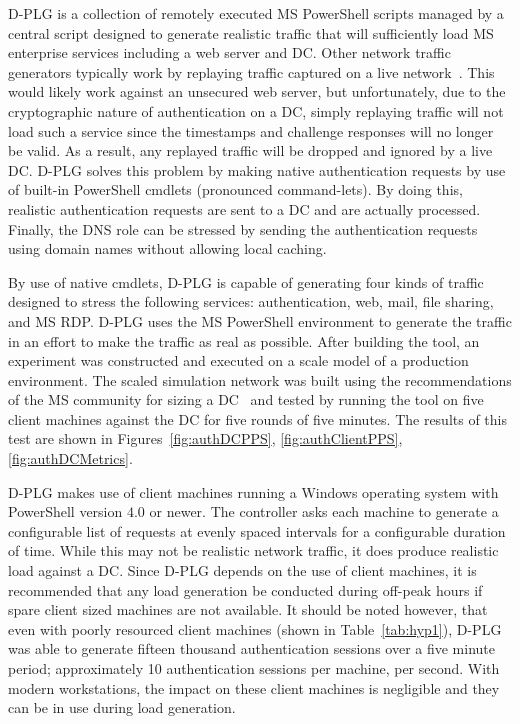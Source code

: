 \ac{D-PLG} is a collection of remotely executed \ac{MS} PowerShell scripts
managed by a central script designed to generate realistic traffic that will
sufficiently load \ac{MS} enterprise services including a web server and
\ac{DC}.  Other network traffic generators typically work by replaying traffic
captured on a live network~\cite{jordan2016}.  This would likely work against
an unsecured web server, but unfortunately, due to the cryptographic nature of
authentication on a \ac{DC}, simply replaying traffic will not load such a
service since the timestamps and challenge responses will no longer be valid.
As a result, any replayed traffic will be dropped and ignored by a live
\ac{DC}.  \ac{D-PLG} solves this problem by making native authentication
requests by use of built-in PowerShell cmdlets (pronounced command-lets).  By
doing this, realistic authentication requests are sent to a \ac{DC} and are
actually processed.  Finally, the \ac{DNS} role can be stressed by sending the
authentication requests using domain names without allowing local caching.

By use of native cmdlets, \ac{D-PLG} is capable of generating four kinds of
traffic designed to stress the following services: authentication, web, mail,
file sharing, and \ac{MS} \ac{RDP}.  \ac{D-PLG} uses the \ac{MS} PowerShell
environment to generate the traffic in an effort to make the traffic as real as
possible.  After building the tool, an experiment was constructed and executed
on a scale model of a production environment.  The scaled simulation network
was built using the recommendations of the \ac{MS} community for sizing a
\ac{DC}~\cite{mak12} and tested by running the tool on five client machines
against the \ac{DC} for five rounds of five minutes.  The results of this test
are shown in Figures~\ref{fig:authDCPPS}, \ref{fig:authClientPPS},
\ref{fig:authDCMetrics}.

\figAuthDCPPS{4in}
\figAuthClientPPS{4in}
\figAuthDCMetrics{4in}

\ac{D-PLG} makes use of client machines running a Windows operating system with
PowerShell version $4.0$ or newer.  The controller asks each machine to
generate a configurable list of requests at evenly spaced intervals for a
configurable duration of time.  While this may not be realistic network
traffic, it does produce realistic load against a \ac{DC}.  Since \ac{D-PLG}
depends on the use of client machines, it is recommended that any load
generation be conducted during off-peak hours if spare client sized machines
are not available.  It should be noted however, that even with poorly resourced
client machines (shown in Table~\ref{tab:hyp1}), \ac{D-PLG} was able to
generate fifteen thousand authentication sessions over a five minute period;
approximately 10 authentication sessions per machine, per second.  With modern
workstations, the impact on these client machines is negligible and they can be
in use during load generation.

